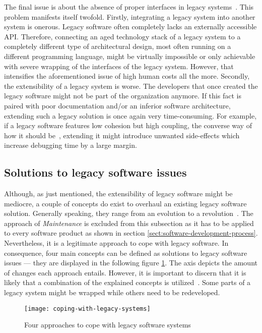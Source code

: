 \documentclass[12pt,a4paper]{report}
\begin{document}
The final issue is about the absence of proper interfaces
in legacy systems~\cite{bisbal-legacy-issues}. This problem manifests itself twofold.
Firstly, integrating a legacy system into another system is onerous.
Legacy software often completely lacks an externally accessible API.
Therefore, connecting an aged technology stack of a legacy system to a completely
different type of architectural design, most often running on a different programming language,
might be virtually impossible or only achievable with severe wrapping
of the interfaces of the legacy system. However, that intensifies the aforementioned
issue of high human costs all the more.
Secondly, the extensibility of a legacy system is worse.
The developers that once created the legacy software might not be part of the
organization anymore. If this fact is paired with poor documentation and/or
an inferior software architecture, extending such a legacy solution is once again
very time-consuming. For example, if a legacy software features
low cohesion but high coupling, the converse way of how it should be~\cn,
extending it might introduce unwanted side-effects which increase debugging
time by a large margin.


\subsection{Solutions to legacy software issues}

Although, as just mentioned, the extensibility of legacy software might be mediocre,
a couple of concepts do exist to overhaul an existing legacy software solution.
Generally speaking, they range from an evolution to a revolution~\cite{bisbal-legacy-issues}.
The approach of \textit{Maintenance} is excluded from this subsection as it
has to be applied to every software product as shown in section \ref{sect:software-development-process}.
Nevertheless, it is a legitimate approach to cope with legacy software.
In consequence, four main concepts can be defined as solutions to legacy software issues ---
they are displayed in the following figure \ref{fig:coping-legacy}.
The axis depicts the amount of changes each approach entails.
However, it is important to discern that it is likely that a combination of
the explained concepts is utilized~\cite{bisbal-legacy-issues}.
Some parts of a legacy system might be wrapped while others need to be redeveloped.
\begin{figure}[htb]
\centering
\texttt{[image: coping-with-legacy-systems]}
\caption{Four approaches to cope with legacy software systems~\cite{bisbal-legacy-issues}}
\label{fig:coping-legacy}
\end{figure}
\end{document}
